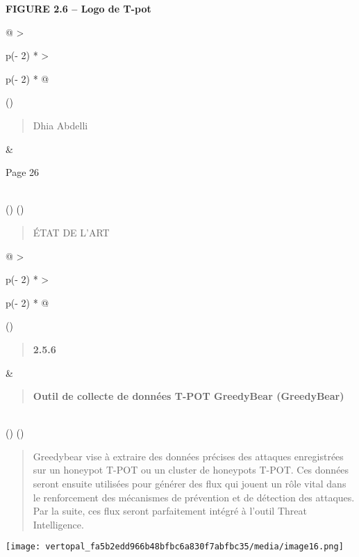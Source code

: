 \documentclass[
]{article}
\begin{document}
\textbf{FIGURE 2.6 -- Logo de T-pot}

\begin{longtable}[]{@{}
  >{\raggedright\arraybackslash}p{(\columnwidth - 2\tabcolsep) * }
  >{\raggedright\arraybackslash}p{(\columnwidth - 2\tabcolsep) * }@{}}
\toprule()
\begin{minipage}[b]{\linewidth}\raggedright
\begin{quote}
Dhia Abdelli
\end{quote}
\end{minipage} & \begin{minipage}[b]{\linewidth}\raggedright
Page 26
\end{minipage} \\
\midrule()
\endhead
\bottomrule()
\end{longtable}

\begin{quote}
ÉTAT DE L'ART
\end{quote}

\begin{longtable}[]{@{}
  >{\raggedright\arraybackslash}p{(\columnwidth - 2\tabcolsep) * }
  >{\raggedright\arraybackslash}p{(\columnwidth - 2\tabcolsep) * }@{}}
\toprule()
\begin{minipage}[b]{\linewidth}\raggedright
\begin{quote}
\textbf{2.5.6}
\end{quote}
\end{minipage} & \begin{minipage}[b]{\linewidth}\raggedright
\begin{quote}
\textbf{Outil de collecte de données T-POT GreedyBear (GreedyBear)}
\end{quote}
\end{minipage} \\
\midrule()
\endhead
\bottomrule()
\end{longtable}

\begin{quote}
Greedybear vise à extraire des données précises des attaques
enregistrées sur un honeypot T-POT ou un cluster de honeypots T-POT. Ces
données seront ensuite utilisées pour générer des flux qui jouent un
rôle vital dans le renforcement des mécanismes de prévention et de
détection des attaques. Par la suite, ces flux seront parfaitement
intégré à l'outil Threat Intelligence.
\end{quote}

\texttt{[image: vertopal\_fa5b2edd966b48bfbc6a830f7abfbc35/media/image16.png]}
\end{document}
